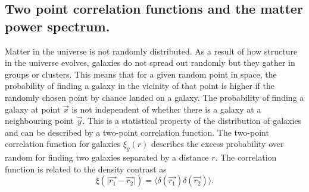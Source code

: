 \subsection{Two point correlation functions and the matter power spectrum.} \label{sec:corrtheory}
Matter in the universe is not randomly distributed. As a result of how structure in the universe evolves, galaxies
do not spread out randomly but they gather in groups or clusters. This means that for a given random point in space, the probability of finding
a galaxy in the vicinity of that point is higher if the randomly chosen point by chance landed on a galaxy. The probability of finding a galaxy
at point $\vec{x}$ is not independent of whether there is a galaxy at a neighbouring point $\vec{y}$. This is a statistical property of the distribution
of galaxies and can be described by a two-point correlation function. The two-point correlation function for galaxies $\xi_{g}(r)$ describes the excess probability
over random for finding two galaxies separated by a distance $r$. The correlation function is related to the density contrast as
\begin{equation}
    \xi(\vert\vec{r_1}-\vec{r_2}\vert)=\langle\delta(\vec{r_1})\delta(\vec{r_2})\rangle.
\end{equation}

